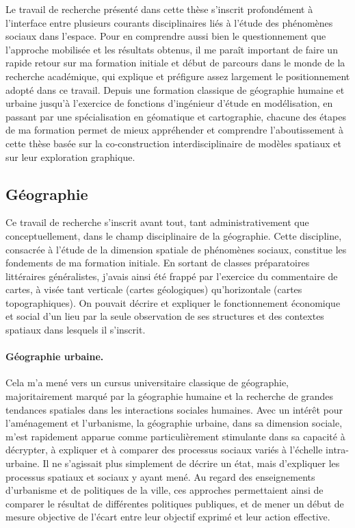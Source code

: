 Le travail de recherche présenté dans cette thèse s'inscrit profondément à l'interface entre plusieurs courants disciplinaires liés à l'étude des phénomènes sociaux dans l'espace.
Pour en comprendre aussi bien le questionnement que l'approche mobilisée et les résultats obtenus, il me paraît important de faire un rapide retour sur ma formation initiale et début de parcours dans le monde de la recherche académique, qui explique et préfigure assez largement le positionnement adopté dans ce travail.
Depuis une formation classique de géographie humaine et urbaine jusqu'à l'exercice de fonctions d'ingénieur d'étude en modélisation, en passant par une spécialisation en géomatique et cartographie, chacune des étapes de ma formation permet de mieux appréhender et comprendre l'aboutissement à cette thèse basée sur la co-construction interdisciplinaire de modèles spatiaux et sur leur exploration graphique.

\subsection{Géographie}

Ce travail de recherche s'inscrit avant tout, tant administrativement que conceptuellement, dans le champ disciplinaire de la géographie.
Cette discipline, consacrée à l'étude de la dimension spatiale de phénomènes sociaux, constitue les fondements de ma formation initiale.
En sortant de classes préparatoires littéraires généralistes, j'avais ainsi été frappé par l'exercice du commentaire de cartes, à visée tant verticale (cartes géologiques) qu'horizontale (cartes topographiques).
On pouvait décrire et expliquer le fonctionnement économique et social d'un lieu par la seule observation de ses structures et des contextes spatiaux dans lesquels il s'inscrit.

\paragraph{Géographie urbaine.}

Cela m'a mené vers un cursus universitaire classique de géographie, majoritairement marqué par la géographie humaine et la recherche de grandes tendances spatiales dans les interactions sociales humaines.
Avec un intérêt pour l'aménagement et l'urbanisme, la géographie urbaine, dans sa dimension sociale, m'est rapidement apparue comme particulièrement stimulante dans sa capacité à décrypter, à expliquer et à comparer des processus sociaux variés à l'échelle intra-urbaine.
Il ne s'agissait plus simplement de décrire un état, mais d'expliquer les processus spatiaux et sociaux y ayant mené.
Au regard des enseignements d'urbanisme et de politiques de la ville, ces approches permettaient ainsi de comparer le résultat de différentes politiques publiques, et de mener un début de mesure objective de l'écart entre leur objectif exprimé et leur action effective.

